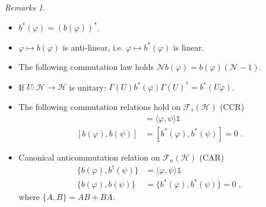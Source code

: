\documentclass[
a4paper, %
11pt, %
onecolumn, %
openany, %
]{memoir}
\theoremstyle{definition}
\theoremstyle{remark}
\newtheorem{remarks}[definition]{Remarks}
\theoremstyle{plain}
\begin{document}
\begin{remarks}
	\begin{itemize}
		\item $b^*(\varphi)=(b(\varphi))^*$.
		\item $\varphi\mapsto b(\varphi)$ is anti-linear, i.e. $\varphi\mapsto b^*(\varphi)$ is linear.
		\item The following commutation law holds $\mathcal{N} b(\varphi)=b(\varphi)(\mathcal{N} -1)$. 
		\item If $U:\mathcal{H}\rightarrow\mathcal{H}$ is unitary: $\Gamma(U)b^*(\varphi)\Gamma(U)^*=b^*(U\varphi)$.
		\item The following commutation relations hold on $\mathcal{F}_s(\mathcal{H})$ (CCR) \begin{align}
		[b(\varphi),b^*(\psi)]&=\langle\varphi,\psi\rangle\mathds{1}\\
		[b(\varphi),b(\psi)]&=[b^*(\varphi),b^*(\psi)]=0\; .
		\end{align}
		\item Canonical anticommutation relation on $\mathcal{F}_a(\mathcal{H})$ (CAR)\begin{align}
		\{b(\varphi),b^{\dagger}(\psi)\}&=\langle\varphi,\psi\rangle \mathds{1}\\
		\{b(\varphi),b(\psi)\}&=\{b^*(\varphi),b^*(\psi)\}=0\; ,
		\end{align}
		where $\{A,B\}=AB+BA$.
	\end{itemize}
\end{remarks}
\end{document}
